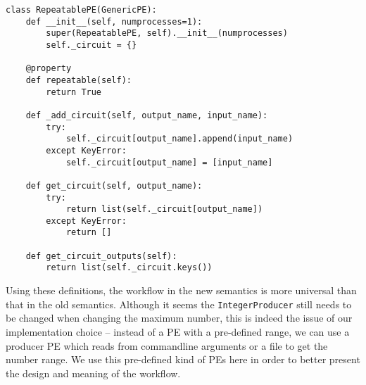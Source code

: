\begin{lstlisting}[frame=single,caption={Example code of the ExpandablePrimeSieve class},captionpos=b,
label={lst:wf_RepeatablePE_def}
]
class RepeatablePE(GenericPE):
    def __init__(self, numprocesses=1):
        super(RepeatablePE, self).__init__(numprocesses)
        self._circuit = {}

    @property
    def repeatable(self):
        return True

    def _add_circuit(self, output_name, input_name):
        try:
            self._circuit[output_name].append(input_name)
        except KeyError:
            self._circuit[output_name] = [input_name]

    def get_circuit(self, output_name):
        try:
            return list(self._circuit[output_name])
        except KeyError:
            return []

    def get_circuit_outputs(self):
        return list(self._circuit.keys())
\end{lstlisting}

Using these definitions, the workflow in the new semantics is more universal than that in the old semantics. Although it seems the \lstinline|IntegerProducer| still needs to be changed when changing the maximum number, this is indeed the issue of our implementation choice -- instead of a PE with a pre-defined range, we can use a producer PE which reads from commandline arguments or a file to get the number range. We use this pre-defined kind of PEs here in order to better present the design and meaning of the workflow.
